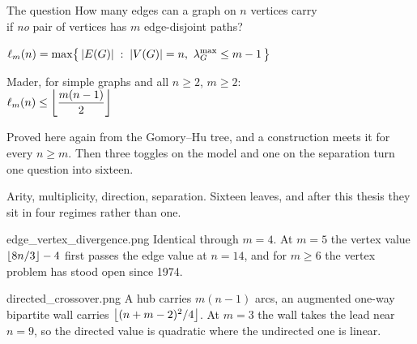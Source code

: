 \documentclass[aspectratio=1610,11pt]{beamer}
\begin{document}

\begin{frame}{The question}
\vfill
\centering
{\large How many edges can a graph on $n$ vertices carry}\\[2pt]
{\large if \emph{no} pair of vertices has $m$ edge-disjoint paths?}

\vspace{16pt}
{\color{KULblauw3b}\Large $\displaystyle \ell_m(n)=\max\bigl\{\,|E(G)| \;:\; |V(G)|=n,\ \lambda^{\max}_G\le m-1\,\bigr\}$}

\vspace{18pt}
\begin{minipage}{0.62\textwidth}
\centering
{\color{black!45}\small Mader, for simple graphs and all $n\ge2$, $m\ge2$:}\\[6pt]
{\color{KULblauw1}\Large $\displaystyle \ell_m(n)\le\left\lfloor \frac{m(n-1)}{2}\right\rfloor$}
\end{minipage}

\vspace{18pt}
{\footnotesize\color{black!60} Proved here again from the Gomory--Hu tree, and a construction meets it for every $n\ge m$. Then three toggles on the model and one on the separation turn one question into sixteen.}
\vfill
\end{frame}

  {\figvarianttree}
  {Arity, multiplicity, direction, separation. Sixteen leaves, and after this thesis they sit in four regimes rather than one.}

  {edge_vertex_divergence.png}
  {Identical through $m=4$. At $m=5$ the vertex value $\left\lfloor 8n/3\right\rfloor-4$ first passes the edge value at $n=14$, and for $m\ge6$ the vertex problem has stood open since 1974.}

  {directed_crossover.png}
  {A hub carries $m(n-1)$ arcs, an augmented one-way bipartite wall carries $\left\lfloor (n+m-2)^2/4\right\rfloor$. At $m=3$ the wall takes the lead near $n=9$, so the directed value is quadratic where the undirected one is linear.}
\end{document}
